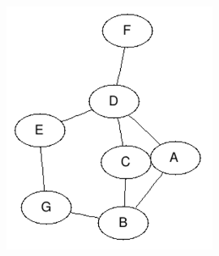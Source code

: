 \documentclass[color,table,oneside,nolot,nolof]{fithesis}
\begin{document}
\begin{figure}
	\centering
	\includegraphics[width=0.6\textwidth]{pictures/neato_example.png} 
\end{figure}
\end{document}
